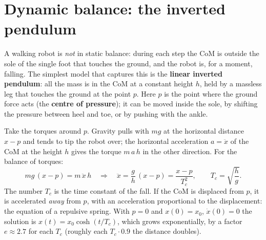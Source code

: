 \begin{center}
\end{center}

\section*{Dynamic balance: the inverted pendulum}
A walking robot is \emph{not} in static balance: during each step the CoM is outside the sole of the single foot that touches the ground, and the robot is, for a moment, falling. The simplest model that captures this is the \textbf{linear inverted pendulum}: all the mass is in the CoM at a constant height $h$, held by a massless leg that touches the ground at the point $p$. Here $p$ is the point where the ground force acts (the \textbf{centre of pressure}); it can be moved inside the sole, by shifting the pressure between heel and toe, or by pushing with the ankle.

Take the torques around $p$. Gravity pulls with $mg$ at the horizontal distance $x-p$ and tends to tip the robot over; the horizontal acceleration $a=\ddot x$ of the CoM at the height $h$ gives the torque $m\,a\,h$ in the other direction. For the balance of torques:
\[
m g\,(x-p)=m\,\ddot x\,h\quad\Longrightarrow\quad \ddot x=\frac{g}{h}\,(x-p)=\frac{x-p}{T_c^{2}},\qquad T_c=\sqrt{\frac{h}{g}} .
\]
The number $T_c$ is the time constant of the fall. If the CoM is displaced from $p$, it is accelerated \emph{away} from $p$, with an acceleration proportional to the displacement: the equation of a repulsive spring. With $p=0$ and $x(0)=x_0$, $\dot x(0)=0$ the solution is $x(t)=x_0\cosh(t/T_c)$, which grows exponentially, by a factor $e\approx2.7$ for each $T_c$ (roughly each $T_c\cdot 0.9$ the distance doubles).


